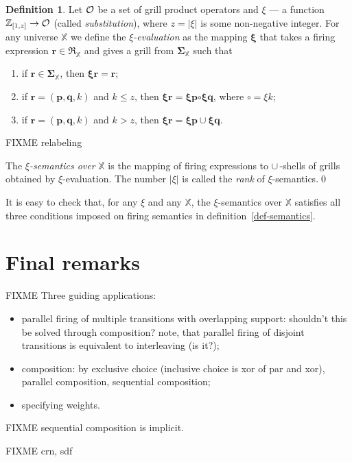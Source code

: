 \documentclass [a4paper,12pt] {article}
\theoremstyle{definition}
\newtheorem{definition}{Definition}[section]
\newcommand{\domain}{}
\DeclareRobustCommand{\domain}{\mathop{\textstyle\mathsmaller{\bf {Dom}}}}
\begin{document}
\begin {definition}\label{def-evaluation}
  Let ${\cal O}$ be a set of grill product operators and $\xi$ --- a
  function ${\mathbb Z}_{[1,z]} \rightarrow {\cal O}$ (called {\em
    substitution}\/), where $z = |\!\domain{\xi}|$ is some
  non-negative integer.  For any universe ${\mathbb X}$ we define the
  {\em $\xi$-evaluation}\/ as the mapping $\bm{\xi}$ that takes a
  firing expression $\bm{r} \in \mathfrak{R}_{\mathbb X}$ and gives a
  grill from $\bm{\Sigma}_{\mathbb X}$ such that
  \begin {enumerate}
    \item if $\bm{r} \in \bm{\Sigma}_{\mathbb X}$, then
      $\bm{\xi}\bm{r} = \bm{r}$;
    \item if $\bm{r} = (\bm{p}, \bm{q}, k)$ and $k \leq z$, then
      $\bm{\xi}\bm{r} = \bm{\xi}\bm{p} \bm{\circ} \bm{\xi}\bm{q}$,
      where $\bm{\circ} = \xi k$;
    \item if $\bm{r} = (\bm{p}, \bm{q}, k)$ and $k > z$, then
      $\bm{\xi}\bm{r} = \bm{\xi}\bm{p} \cup \bm{\xi}\bm{q}$.
  \end {enumerate}

  FIXME relabeling

  The {\em $\xi$-semantics over}\/ ${\mathbb X}$ is the mapping of
  firing expressions to $\cup$\,-shells of grills obtained by
  $\xi$-evaluation.  The number $|\!\domain{\xi}|$ is called the {\em
    rank}\/ of $\xi$-semantics.\qed
\end {definition}

It is easy to check that, for any $\xi$ and any ${\mathbb X}$, the
$\xi$-semantics over ${\mathbb X}$ satisfies all three conditions
imposed on firing semantics in definition~\ref{def-semantics}.

\section {Final remarks}

FIXME Three guiding applications:
%
\begin {itemize}
\item parallel firing of multiple transitions with overlapping
  support: shouldn't this be solved through composition? note, that
  parallel firing of disjoint transitions is equivalent to
  interleaving (is it?);

\item composition: by exclusive choice (inclusive choice is xor of
  par and xor), parallel composition, sequential composition;

\item specifying weights.
\end {itemize}

FIXME sequential composition is implicit.

FIXME crn, sdf
\end{document}
